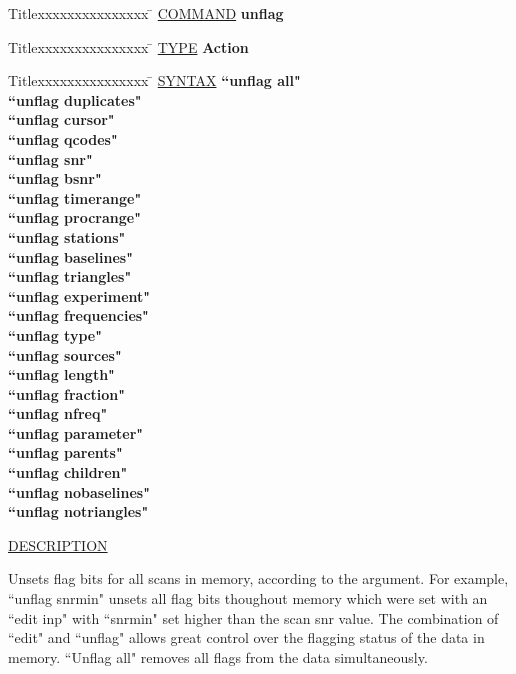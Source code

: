 \begin{tabbing}
Titlexxxxxxxxxxxxxxx \= \kill
\underline{COMMAND} \> {\bf 	unflag} \\
\end{tabbing}

\begin{tabbing}
Titlexxxxxxxxxxxxxxx \= \kill
\underline{TYPE} \> {\bf 		Action} \\
\end{tabbing}

\begin{tabbing}
Titlexxxxxxxxxxxxxxx \= \kill
\underline{SYNTAX} \> {\bf 		``unflag all"} \\
\> {\bf 		``unflag duplicates"} \\
\> {\bf 		``unflag cursor"} \\
\> {\bf 		``unflag qcodes"} \\
\> {\bf 		``unflag snr"} \\
\> {\bf 		``unflag bsnr"} \\
\> {\bf 		``unflag timerange"} \\
\> {\bf 		``unflag procrange"} \\
\> {\bf 		``unflag stations"} \\
\> {\bf 		``unflag baselines"} \\
\> {\bf 		``unflag triangles"} \\
\> {\bf 		``unflag experiment"} \\
\> {\bf 		``unflag frequencies"} \\
\> {\bf 		``unflag type"} \\
\> {\bf 		``unflag sources"} \\
\> {\bf 		``unflag length"} \\
\> {\bf 		``unflag fraction"} \\
\> {\bf 		``unflag nfreq"} \\
\> {\bf 		``unflag parameter"} \\
\> {\bf 		``unflag parents"} \\
\> {\bf 		``unflag children"} \\
\> {\bf 		``unflag nobaselines"} \\
\> {\bf 		``unflag notriangles"} \\
\end{tabbing}

\underline{DESCRIPTION}
\begin{list}{}{\setlength{\leftmargin}{0.5in}
     \setlength{\rightmargin}{0in}}
\item
Unsets flag bits for all scans in memory, according to the
argument.  For example, ``unflag snrmin" unsets all flag bits
thoughout memory which were set with an ``edit inp" with
``snrmin" set higher than the scan snr value.  The combination
of ``edit" and ``unflag" allows great control over the flagging
status of the data in memory.  ``Unflag all" removes all flags
from the data simultaneously.
\end{list}
\vspace{.2in}

